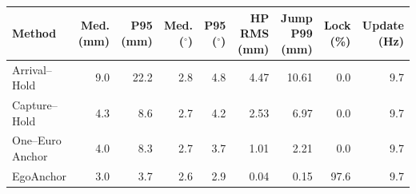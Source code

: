\begin{tabular}{lrrrrrrrr}
\toprule
Method & Med. (mm) & P95 (mm) & Med. ($^\circ$) & P95 ($^\circ$) & HP RMS (mm) & Jump P99 (mm) & Lock (\%) & Update (Hz) \\
\midrule
Arrival--Hold & 9.0 & 22.2 & 2.8 & 4.8 & 4.47 & 10.61 & 0.0 & 9.7 \\
Capture--Hold & 4.3 & 8.6 & 2.7 & 4.2 & 2.53 & 6.97 & 0.0 & 9.7 \\
One--Euro Anchor & 4.0 & 8.3 & 2.7 & 3.7 & 1.01 & 2.21 & 0.0 & 9.7 \\
EgoAnchor & 3.0 & 3.7 & 2.6 & 2.9 & 0.04 & 0.15 & 97.6 & 9.7 \\
\bottomrule
\end{tabular}
